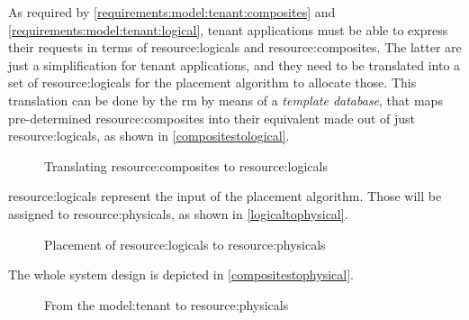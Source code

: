 As required by \ref{requirements:model:tenant:composites} and \ref{requirements:model:tenant:logical}, tenant applications must be able to express their requests in terms of \glspl{resource:logical} and \glspl{resource:composite}.
The latter are just a simplification for tenant applications, and they need to be translated into a set of \glspl{resource:logical} for the placement algorithm to allocate those.
This translation can be done by the \gls{rm} by means of a \textit{template database}, that maps pre-determined \glspl{resource:composite} into their equivalent made out of just \glspl{resource:logical}, as shown in \autoref{compositestological}.

\begin{figure}[!htb]
    \centering
    \usebox{\compositestological}
    \caption{Translating \glspl{resource:composite} to \glspl{resource:logical}}
    \label{compositestological}
\end{figure}

\Glspl{resource:logical} represent the input of the placement algorithm. Those will be assigned to \glspl{resource:physical}, as shown in \autoref{logicaltophysical}.

\begin{figure}[!htb]
    \centering
    \usebox{\logicaltophysical}
    \caption{Placement of \glspl{resource:logical} to \glspl{resource:physical}}
    \label{logicaltophysical}
\end{figure}

The whole system design is depicted in \autoref{compositestophysical}.

\begin{figure}[!htb]
    \centering
    \usebox{\compositestophysical}
    \caption{From the \gls{model:tenant} to \glspl{resource:physical}}
    \label{compositestophysical}
\end{figure}